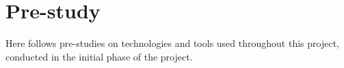 \chapter{Pre-study}

Here follows pre-studies on technologies and tools used throughout this project, conducted in the initial phase of the project.


